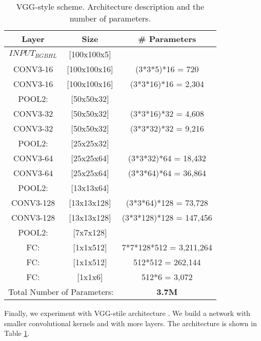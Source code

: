 \documentclass[review,12pt,3p]{elsarticle}
\begin{document}
\begin{table}[!ht]
\centering
\scriptsize
\begin{tabular}{  c  c | c} 

        Layer   &   Size  & \# Parameters \\
               \hline
$INPUT_{RGBHL}$  & [100x100x5]  		&      \\
CONV3-16 & [100x100x16] 		&   (3*3*5)*16 	  =      720 \\
CONV3-16& [100x100x16]  	&   (3*3*16)*16   =    2,304 \\
POOL2:   &  [50x50x32] 		&    \\
CONV3-32&  [50x50x32] 		&   (3*3*16)*32   =    4,608\\
CONV3-32&  [50x50x32] 		&   (3*3*32)*32   =    9,216\\
POOL2:   &  [25x25x32] 		&   \\
CONV3-64&  [25x25x64] 		&   (3*3*32)*64   =   18,432\\
CONV3-64 & [25x25x64] 		&   (3*3*64)*64   =   36,864\\
POOL2:    & [13x13x64] 		&   \\
CONV3-128 &[13x13x128] 		&   (3*3*64)*128  =   73,728\\
CONV3-128 &[13x13x128] 		&   (3*3*128)*128 =  147,456\\
POOL2:  &    [7x7x128] 		&   \\
FC:      &   [1x1x512] 		&   7*7*128*512   = 3,211,264\\
FC:      &   [1x1x512] 		&   512*512 	  =   262,144\\
FC:      &   [1x1x6]		&   512*6 	  =     3,072\\   
\hline
\multicolumn{2}{c}{ Total Number of Parameters:} & \textbf{3.7M} \\

\end{tabular}

\caption{VGG-style scheme. Architecture description and the number of parameters.}

\label{tab:vggStyle}
\end{table}

Finally, we experiment with VGG-stile architecture \cite{DBLP:journals/corr/SimonyanZ14a}. We build a network with smaller convolutional kernels and with more layers. The architecture is shown in Table \ref{tab:vggStyle}. 
\end{document}
